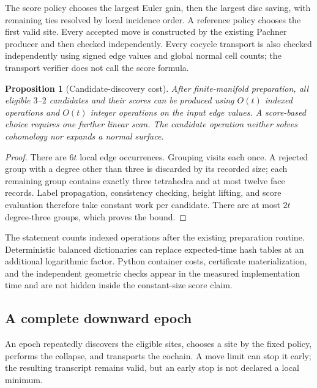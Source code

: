 \documentclass[11pt,letterpaper]{article}
\newtheorem{proposition}[theorem]{Proposition}
\theoremstyle{definition}
\theoremstyle{remark}
\begin{document}
The score policy chooses the largest Euler gain, then the largest disc
saving, with remaining ties resolved by local incidence order. A reference
policy chooses the first valid site. Every accepted move is constructed by
the existing Pachner producer and then checked independently. Every cocycle
transport is also checked independently using signed edge values and
global normal cell counts; the transport verifier does not call the score
formula.

\begin{proposition}[Candidate-discovery cost]
\label{prop:scoring}
After finite-manifold preparation, all eligible $3$--$2$ candidates and
their scores can be produced using $O(t)$ indexed operations and $O(t)$
integer operations on the input edge values. A score-based choice requires
one further linear scan. The candidate operation neither solves cohomology
nor expands a normal surface.
\end{proposition}
\begin{proof}
There are $6t$ local edge occurrences. Grouping visits each once. A rejected
group with a degree other than three is discarded by its recorded size;
each remaining group contains exactly three tetrahedra and at most twelve
face records. Label propagation, consistency checking, height lifting,
and score evaluation therefore take constant work per candidate.
There are at most $2t$ degree-three groups, which proves the bound.
\end{proof}

The statement counts indexed operations after the existing preparation
routine. Deterministic balanced dictionaries can replace expected-time
hash tables at an additional logarithmic factor. Python container costs,
certificate materialization, and the independent geometric checks appear in
the measured implementation time and are not hidden inside the constant-size
score claim.

\subsection{A complete downward epoch}

An epoch repeatedly discovers the eligible sites, chooses a site by the
fixed policy, performs the collapse, and transports the cochain. A move
limit can stop it early; the resulting transcript remains valid, but an
early stop is not declared a local minimum.
\end{document}

